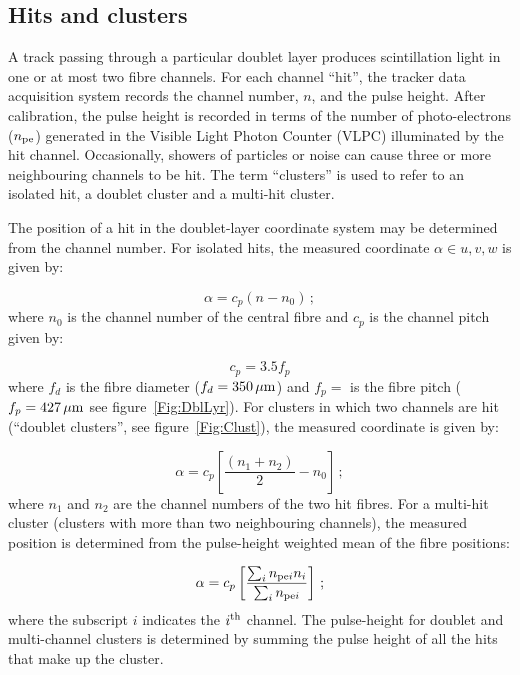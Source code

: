 \subsection{Hits and clusters}
\label{SubSect:SciFiHtsClstrs}

A track passing through a particular doublet layer produces scintillation light in one or at most two fibre channels. For each channel ``hit'', the tracker data acquisition system records the channel number, $n$, and the pulse height. After calibration, the pulse height is recorded in terms of the number of photo-electrons ($n_{\rm pe}$) generated in the Visible Light Photon Counter (VLPC) illuminated by the hit channel. Occasionally, showers of particles or noise can cause three or more neighbouring channels to be hit. The term ``clusters'' is used to refer to an isolated hit, a doublet cluster and a multi-hit cluster.

The position of a hit in the doublet-layer coordinate system may be determined from the channel number. For isolated hits, the measured coordinate $\alpha \in {u, v, w}$ is given by:

\begin{equation}
  \alpha = c_p (n - n_0)\,;
\end{equation}
where $n_0$ is the channel number of the central fibre and $c_p$ is the channel pitch given by:

\begin{equation}
  c_p = 3.5f_p
\end{equation}
where $f_d$ is the fibre diameter ($f_d = 350\,\mu{\rm m}$) and $f_p = $ is the fibre pitch ($f_p = 427\,\mu{\rm m}$ see figure~\ref{Fig:DblLyr}). For clusters in which two channels are hit (``doublet clusters'', see figure~\ref{Fig:Clust}), the measured coordinate is given by:

\begin{equation}
  \alpha = c_p \left[ \frac{( n_1 + n_2)}{2} - n_0 \right]\,;
\end{equation}
where $n_1$ and $n_2$ are the channel numbers of the two hit fibres. For a multi-hit cluster (clusters with more than two neighbouring channels), the measured position is determined from the pulse-height weighted mean of the fibre positions:

\begin{equation}
  \alpha = c_p \left[ 
                 \frac{\sum_i n_{{\rm pe}i}n_i}{\sum_i n_{{\rm pe}i}} 
               \right]\,;
\end{equation}
where the subscript $i$ indicates the $i^{\rm th}$ channel. The pulse-height for doublet and multi-channel clusters is determined by summing the pulse height of all the hits that make up the cluster.

